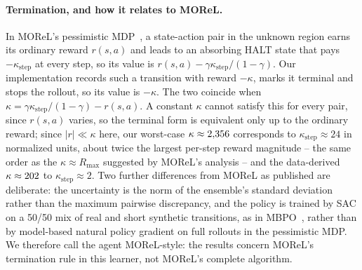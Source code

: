 \documentclass[11pt]{article}
\begin{document}
\paragraph{Termination, and how it relates to MOReL.} In MOReL's pessimistic MDP~\citep{kidambi2020morel}, a state-action pair in the unknown region earns its ordinary reward $r(s,a)$ and leads to an absorbing HALT state that pays $-\kappa_{\text{step}}$ at every step, so its value is $r(s,a) - \gamma\kappa_{\text{step}}/(1-\gamma)$. Our implementation records such a transition with reward $-\kappa$, marks it terminal and stops the rollout, so its value is $-\kappa$. The two coincide when $\kappa = \gamma\kappa_{\text{step}}/(1-\gamma) - r(s,a)$. A constant $\kappa$ cannot satisfy this for every pair, since $r(s,a)$ varies, so the terminal form is equivalent only up to the ordinary reward; since $|r|\ll\kappa$ here, our worst-case $\kappa\approx2{,}356$ corresponds to $\kappa_{\text{step}}\approx 24$ in normalized units, about twice the largest per-step reward magnitude -- the same order as the $\kappa\approx R_{\max}$ suggested by MOReL's analysis -- and the data-derived $\kappa\approx202$ to $\kappa_{\text{step}}\approx 2$. Two further differences from MOReL as published are deliberate: the uncertainty is the norm of the ensemble's standard deviation rather than the maximum pairwise discrepancy, and the policy is trained by SAC on a 50/50 mix of real and short synthetic transitions, as in MBPO~\citep{janner2019mbpo}, rather than by model-based natural policy gradient on full rollouts in the pessimistic MDP. We therefore call the agent MOReL-style: the results concern MOReL's termination rule in this learner, not MOReL's complete algorithm.
\end{document}
